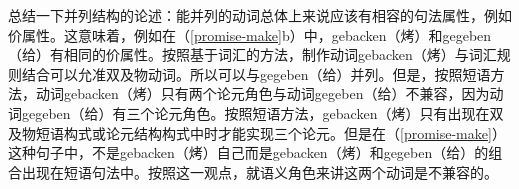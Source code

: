     总结一下并列结构的论述：能并列的动词总体上来说应该有相容的句法属性，例如价属性。这意味着，例如在（\ref{promise-make}b）中，gebacken（烤）和gegeben（给）有相同的价属性。按照基于词汇的方法，制作动词gebacken（烤）与词汇规则结合可以允准双及物动词。所以可以与gegeben（给）并列。但是，按照短语方法，动词gebacken（烤）只有两个论元角色与动词gegeben（给）不兼容，因为动词gegeben（给）有三个论元角色。按照短语方法，gebacken（烤）只有出现在双及物短语构式或论元结构构式中时才能实现三个论元。但是在（\ref{promise-make}）这种句子中，不是gebacken（烤）自己而是gebacken（烤）和gegeben（给）的组合出现在短语句法中。按照这一观点，就语义角色来讲这两个动词是不兼容的。

